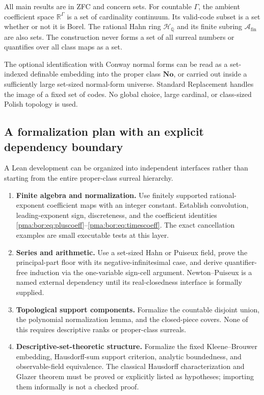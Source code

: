 \documentclass[11pt]{article}
\numberwithin{equation}{section}
\theoremstyle{definition}
\theoremstyle{remark}
\newcommand{\Q}{\mathbb Q}
\newcommand{\R}{\mathbb R}
\newcommand{\No}{\mathbf{No}}
\newcommand{\A}{\mathcal A_{\mathrm{fin}}}
\newcommand{\HQ}{\mathcal H_{\Q}}
\begin{document}
All main results are in ZFC and concern sets. For countable $\Gamma$, the
ambient coefficient space $\R^\Gamma$ is a set of cardinality continuum.
Its valid-code subset is a set whether or not it is Borel. The rational Hahn
ring $\HQ$ and its finite subring $\A$ are also sets. The construction never
forms a set of all surreal numbers or quantifies over all class maps as a set.

The optional identification with Conway normal forms can be read as a
set-indexed definable embedding into the proper class $\No$, or carried out
inside a sufficiently large set-sized normal-form universe. Standard
Replacement handles the image of a fixed set of codes. No global choice,
large cardinal, or class-sized Polish topology is used.

\subsection{A formalization plan with an explicit dependency boundary}

A Lean development can be organized into independent interfaces rather than
starting from the entire proper-class surreal hierarchy.
\begin{enumerate}[label=\textbf{Layer \arabic*.}]
\item \textbf{Finite algebra and normalization.}
Use finitely supported rational-exponent coefficient maps with an integer
constant. Establish convolution, leading-exponent sign, discreteness, and the
coefficient identities \eqref{pma:bor:eq:pluscoeff}--\eqref{pma:bor:eq:timescoeff}. The exact
cancellation examples are small executable tests at this layer.
\item \textbf{Series and arithmetic.}
Use a set-sized Hahn or Puiseux field, prove the principal-part floor with its
negative-infinitesimal case, and derive quantifier-free induction via the
one-variable sign-cell argument. Newton--Puiseux is a named external dependency
until its real-closedness interface is formally supplied.
\item \textbf{Topological support components.}
Formalize the countable disjoint union, the polynomial normalization lemma,
and the closed-piece covers. None of this requires descriptive ranks or
proper-class surreals.
\item \textbf{Descriptive-set-theoretic structure.}
Formalize the fixed Kleene--Brouwer embedding, Hausdorff-sum support criterion,
analytic boundedness, and observable-field equivalence. The classical
Hausdorff characterization and Glazer theorem must be proved or explicitly
listed as hypotheses; importing them informally is not a checked proof.
\end{enumerate}
\end{document}
